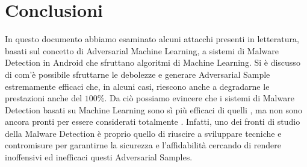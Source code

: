 \section{Conclusioni}
In questo documento abbiamo esaminato alcuni attacchi presenti in letteratura, basati sul concetto di Adversarial Machine Learning, a sistemi di Malware Detection in Android che sfruttano algoritmi di Machine Learning. Si è discusso di com'è possibile sfruttarne le debolezze e generare Adversarial Sample estremamente efficaci che, in alcuni casi, riescono anche a degradarne le prestazioni anche del \(100\%\). Da ciò possiamo evincere che i sistemi di Malware Detection basati su Machine Learning sono sì più efficaci di quelli , ma non sono ancora pronti per essere considerati totalmente . Infatti, uno dei fronti di studio della Malware Detection è proprio quello di riuscire a sviluppare tecniche e contromisure per garantirne la sicurezza e l'affidabilità cercando di rendere inoffensivi ed inefficaci questi Adversarial Samples.



